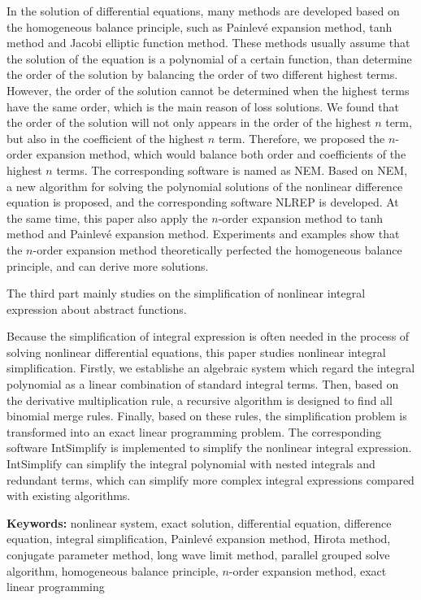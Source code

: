 In the solution of differential equations, many methods are developed based on the  homogeneous balance principle, such as Painlevé expansion method, tanh method and Jacobi elliptic function method. These methods usually assume that the solution of the equation is a polynomial of a certain function, than determine the order of the solution by balancing the order of two different highest terms. However, the order of the solution cannot be determined when the highest terms have the same order, which is the main reason of loss solutions. We found that the order of the solution will not only appears in the order of the highest $n$ term, but also in the coefficient of the highest $n$ term. Therefore, we proposed the $n$-order expansion method, which would balance both order and coefficients of the highest $n$ terms. The corresponding software is named as NEM.  Based on NEM, a new algorithm for solving the polynomial solutions of the nonlinear difference equation is proposed, and the corresponding software NLREP is developed. At the same time, this paper also apply the $n$-order expansion method to tanh method and Painlevé expansion method. Experiments and examples show that the $n$-order expansion method theoretically perfected the homogeneous balance principle, and can derive more solutions.

The third part mainly studies on the simplification of nonlinear integral expression about abstract functions.

Because the simplification of integral expression is often needed in the process of solving nonlinear differential equations, this paper studies nonlinear integral simplification. Firstly, we establishe an algebraic system which  regard the integral polynomial as a linear combination of standard integral terms. Then, based on the derivative multiplication rule, a recursive algorithm is designed to find all binomial merge rules. Finally, based on these rules, the simplification problem is transformed into an exact linear programming problem. The corresponding software  IntSimplify is implemented to simplify the nonlinear integral expression. IntSimplify can simplify the integral polynomial with nested integrals and redundant terms, which can simplify more complex integral expressions compared with existing algorithms.

\bigskip
\noindent\textbf{ Keywords:}
nonlinear system, exact solution, differential equation, difference equation, integral simplification, Painlevé expansion method, Hirota method, conjugate parameter method, long wave limit method, parallel grouped solve algorithm, homogeneous balance principle, $n$-order expansion method, exact linear programming
